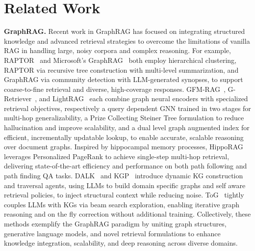 \documentclass{article}
\begin{document}
\section{Related Work}
\textbf{GraphRAG.} Recent work in GraphRAG has focused on integrating structured knowledge and advanced retrieval strategies to overcome the limitations of vanilla RAG in handling large, noisy corpora and complex reasoning. For example, RAPTOR~\cite{raptor} and Microsoft’s GraphRAG~\cite{graphrag} both employ hierarchical clustering, RAPTOR via recursive tree construction with multi-level summarization, and GraphRAG via community detection with LLM-generated synopses, to support coarse-to-fine retrieval and diverse, high-coverage responses. GFM-RAG~\cite{GFM}, G-Retriever~\cite{G-Retriever}, and LightRAG~\cite{lightrag} each combine graph neural encoders with specialized retrieval objectives, respectively a query dependent GNN trained in two stages for multi-hop generalizability, a Prize Collecting Steiner Tree formulation to reduce hallucination and improve scalability, and a dual level graph augmented index for efficient, incrementally updatable lookup, to enable accurate, scalable reasoning over document graphs. Inspired by hippocampal memory processes, HippoRAG~\cite{hippo} leverages Personalized PageRank to achieve single-step multi-hop retrieval, delivering state-of-the-art efficiency and performance on both path following and path finding QA tasks. DALK~\cite{dalk} and KGP~\cite{KGP} introduce dynamic KG construction and traversal agents, using LLMs to build domain specific graphs and self aware retrieval policies, to inject structural context while reducing noise. ToG~\cite{TOG} tightly couples LLMs with KGs via beam search exploration, enabling iterative graph reasoning and on the fly correction without additional training. Collectively, these methods exemplify the GraphRAG paradigm by uniting graph structures, generative language models, and novel retrieval formulations to enhance knowledge integration, scalability, and deep reasoning across diverse domains.
\end{document}
